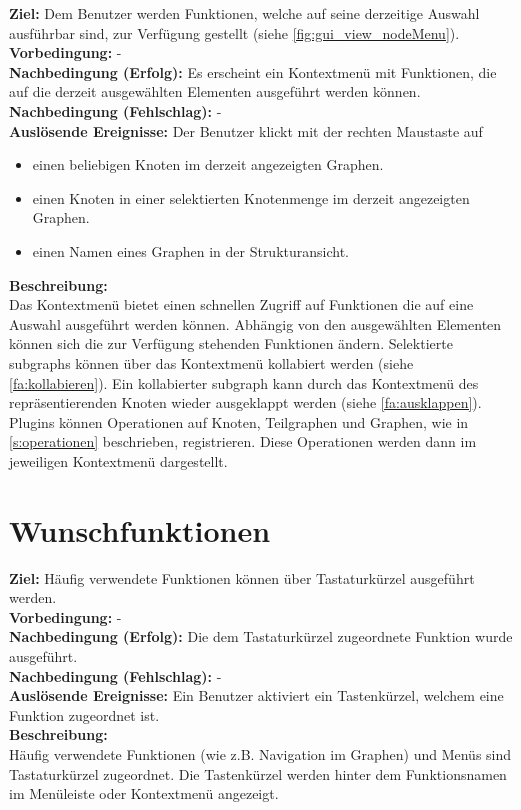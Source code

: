 \label{fa:kontextmenü}
\textbf{Ziel:} Dem Benutzer werden Funktionen, welche auf seine derzeitige Auswahl ausführbar sind, zur Verfügung gestellt (siehe \ref{fig:gui_view_nodeMenu}).\\
\textbf{Vorbedingung:} -\\
\textbf{Nachbedingung (Erfolg):} Es erscheint ein Kontextmenü mit Funktionen, die auf die derzeit ausgewählten Elementen ausgeführt werden können.\\
\textbf{Nachbedingung (Fehlschlag):} -\\
\textbf{Auslösende Ereignisse:} Der Benutzer klickt mit der rechten Maustaste auf
\begin{itemize}[nolistsep]
  \item einen beliebigen Knoten im derzeit angezeigten Graphen.
  \item einen Knoten in einer selektierten Knotenmenge im derzeit angezeigten Graphen.
  \item einen Namen eines Graphen in der Strukturansicht.
\end{itemize}
\textbf{Beschreibung:}\\
Das Kontextmenü bietet einen schnellen Zugriff auf Funktionen die auf eine Auswahl ausgeführt werden können.
Abhängig von den ausgewählten Elementen können sich die zur Verfügung stehenden Funktionen ändern.
Selektierte \glspl{subgraph} können über das Kontextmenü kollabiert werden (siehe \ref{fa:kollabieren}).
Ein kollabierter \gls{subgraph} kann durch das Kontextmenü des repräsentierenden Knoten wieder ausgeklappt werden (siehe \ref{fa:ausklappen}).
Plugins können Operationen auf Knoten, Teilgraphen und Graphen, wie in \ref{s:operationen} beschrieben, registrieren.
Diese Operationen werden dann im jeweiligen Kontextmenü dargestellt.


\section{Wunschfunktionen}

\label{fa:hotkey}
\textbf{Ziel:} Häufig verwendete Funktionen können über Tastaturkürzel ausgeführt werden.\\
\textbf{Vorbedingung:} -\\
\textbf{Nachbedingung (Erfolg):} Die dem Tastaturkürzel zugeordnete Funktion wurde ausgeführt.\\
\textbf{Nachbedingung (Fehlschlag):} -\\
\textbf{Auslösende Ereignisse:}
Ein Benutzer aktiviert ein Tastenkürzel, welchem eine Funktion zugeordnet ist.\\
\textbf{Beschreibung:}\\
Häufig verwendete Funktionen (wie z.B. Navigation im Graphen) und Menüs sind Tastaturkürzel zugeordnet.
Die Tastenkürzel werden hinter dem Funktionsnamen im Menüleiste oder Kontextmenü angezeigt.

